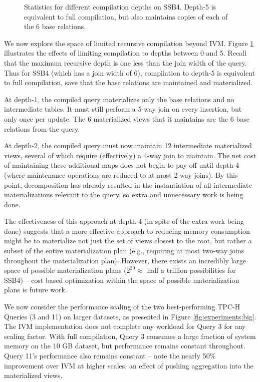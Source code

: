 \begin{figure}
\begin{center}

\caption{Statistics for different compilation depths on SSB4.  Depth-5 is equivalent to full compilation, but also maintains copies of each of the 6 base relations.}
\label{fig:experiments:ssb4depth}
\end{center}
\end{figure}
We now explore the space of limited recursive compilation beyond IVM.  Figure \ref{fig:experiments:ssb4depth} illustrates the effects of limiting compilation to depths between 0 and 5.  Recall that the maximum recursive depth is one less than the join width of the query.  Thus for SSB4 (which has a join width of 6), compilation to depth-5 is equivalent to full compilation, save that the base relations are maintained and materialized.

At depth-1, the compiled query materializes only the base relations and no intermediate tables.  It must still perform a 5-way join on every insertion, but  only once per update.  The 6 materialized views that it maintains are the 6 base relations from the query.  

At depth-2, the compiled query must now maintain 12 intermediate materialized views, several of which require (effectively) a 4-way join to maintain.  The net cost of maintaining these additional maps does not begin to pay off until depth-4 (where maintenance operations are reduced to at most 2-way joins).  By this point, decomposition has already resulted in the instantiation of all intermediate materializations relevant to the query, so extra and unnecessary work is being done.  

The effectiveness of this approach at depth-4 (in spite of the extra work being done) suggests that a more effective approach to reducing memory consumption might be to materialize not just the set of views closest to the root, but rather a subset of the entire materialization plan (e.g., requiring at most two-way joins throughout the materialization plan).  However, there exists an incredibly large space of possible materialization plans ($2^{39} \approx $ half a trillion possibilities for SSB4) -- cost based optimization within the space of possible materialization plans is future work.

We now consider the performance scaling of the two best-performing TPC-H Queries (3 and 11) on larger datasets, as presented in Figure \ref{fig:experiments:big}.  The IVM implementation does not complete any workload for Query 3 for any scaling factor.  With full compilation, Query 3 consumes a large fraction of system memory on the 10 GB dataset, but performance remains constant throughout.  Query 11's performance also remains constant -- note the nearly 50\% improvement over IVM at higher scales, an effect of pushing aggregation into the materialized views.

